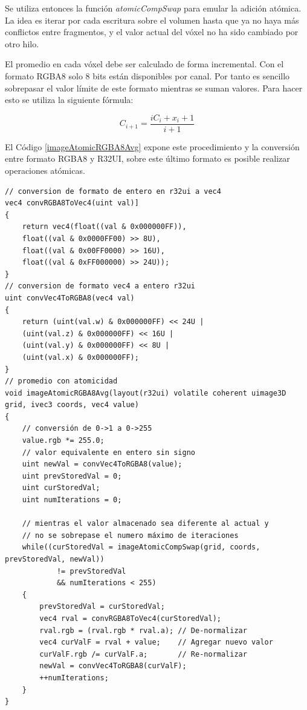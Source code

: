 Se utiliza entonces la función \emph{atomicCompSwap} para emular la adición atómica. La idea es iterar por cada escritura sobre el volumen hasta que ya no haya más conflictos entre fragmentos, y el valor actual del vóxel no ha sido cambiado por otro hilo.

El promedio en cada vóxel debe ser calculado de forma incremental. Con el formato RGBA8 solo 8 bits están disponibles por canal. Por tanto es sencillo sobrepasar el valor límite de este formato mientras se suman valores. Para hacer esto se utiliza la siguiente fórmula:

\begin{equation}
	C_{i+1} = \frac{iC_{i}+x_i+1}{i+1}
\end{equation}

El Código \ref{imageAtomicRGBA8Avg} expone este procedimiento y la conversión entre formato RGBA8 y R32UI, sobre este último formato es posible realizar operaciones atómicas.
\\
\begin{lstlisting}[caption={Conversion entre RGBA8 y R32UI y promedio incremental.}, label=imageAtomicRGBA8Avg]
// conversion de formato de entero en r32ui a vec4
vec4 convRGBA8ToVec4(uint val)]
{
    return vec4(float((val & 0x000000FF)), 
    float((val & 0x0000FF00) >> 8U), 
    float((val & 0x00FF0000) >> 16U), 
    float((val & 0xFF000000) >> 24U));
}
// conversion de formato vec4 a entero r32ui
uint convVec4ToRGBA8(vec4 val)
{
    return (uint(val.w) & 0x000000FF) << 24U | 
    (uint(val.z) & 0x000000FF) << 16U | 
    (uint(val.y) & 0x000000FF) << 8U | 
    (uint(val.x) & 0x000000FF);
}
// promedio con atomicidad
void imageAtomicRGBA8Avg(layout(r32ui) volatile coherent uimage3D grid, ivec3 coords, vec4 value)
{
    // conversión de 0->1 a 0->255
    value.rgb *= 255.0;
    // valor equivalente en entero sin signo
    uint newVal = convVec4ToRGBA8(value);
    uint prevStoredVal = 0;
    uint curStoredVal;
    uint numIterations = 0;

    // mientras el valor almacenado sea diferente al actual y 
    // no se sobrepase el numero máximo de iteraciones
    while((curStoredVal = imageAtomicCompSwap(grid, coords, prevStoredVal, newVal)) 
            != prevStoredVal
            && numIterations < 255)
    {
        prevStoredVal = curStoredVal;
        vec4 rval = convRGBA8ToVec4(curStoredVal);
        rval.rgb = (rval.rgb * rval.a); // De-normalizar
        vec4 curValF = rval + value;    // Agregar nuevo valor
        curValF.rgb /= curValF.a;       // Re-normalizar
        newVal = convVec4ToRGBA8(curValF);
        ++numIterations;
    }
}
\end{lstlisting}


